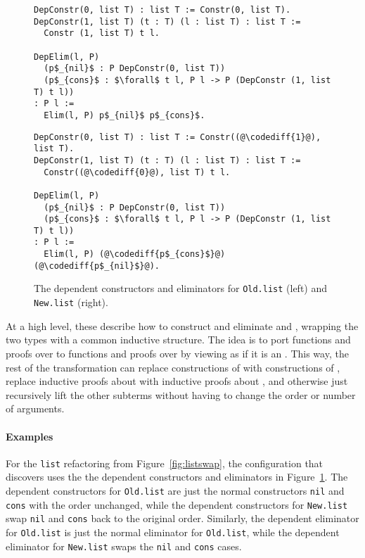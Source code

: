 \begin{figure}
\begin{minipage}{0.46\textwidth}
\begin{lstlisting}
DepConstr(0, list T) : list T := Constr(0, list T).
DepConstr(1, list T) (t : T) (l : list T) : list T :=
  Constr (1, list T) t l.

DepElim(l, P)
  (p$_{nil}$ : P DepConstr(0, list T))
  (p$_{cons}$ : $\forall$ t l, P l -> P (DepConstr (1, list T) t l))
: P l :=
  Elim(l, P) p$_{nil}$ p$_{cons}$.
\end{lstlisting}
\end{minipage}
\hfill
\begin{minipage}{0.46\textwidth}
\begin{lstlisting}
DepConstr(0, list T) : list T := Constr((@\codediff{1}@), list T).
DepConstr(1, list T) (t : T) (l : list T) : list T :=
  Constr((@\codediff{0}@), list T) t l.

DepElim(l, P)
  (p$_{nil}$ : P DepConstr(0, list T))
  (p$_{cons}$ : $\forall$ t l, P l -> P (DepConstr (1, list T) t l))
: P l :=
  Elim(l, P) (@\codediff{p$_{cons}$}@) (@\codediff{p$_{nil}$}@).
\end{lstlisting}
\end{minipage}
\caption{The dependent constructors and eliminators for \lstinline{Old.list} (left) and \lstinline{New.list} (right).}
\label{fig:listconfig}
\end{figure}

At a high level, these describe how to construct and eliminate \A and \B, wrapping the two types with a common inductive structure.
The idea is to port functions and proofs over \A to functions and proofs over \B by viewing \B as if it is an \A.
This way, the rest of the transformation can replace constructions of \A with constructions of \B,
replace inductive proofs about \A with inductive proofs about \B, and otherwise just recursively lift
the other subterms without having to change the order or number of arguments.

\paragraph{Examples}
For the \lstinline{list} refactoring from Figure~\ref{fig:listswap},
the configuration that \toolname discovers uses the the dependent constructors
and eliminators in Figure~\ref{fig:listconfig}. The dependent constructors for \lstinline{Old.list}
are just the normal constructors \lstinline{nil} and \lstinline{cons} with the order unchanged,
while the dependent constructors for \lstinline{New.list} swap \lstinline{nil} and \lstinline{cons}
back to the original order.
Similarly, the dependent eliminator for \lstinline{Old.list} is just the normal eliminator for \lstinline{Old.list},
while the dependent eliminator for \lstinline{New.list} swaps the \lstinline{nil} and \lstinline{cons} cases.


